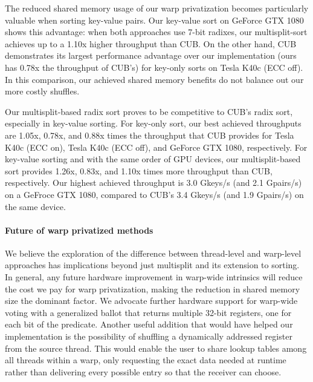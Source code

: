 The reduced shared memory usage of our warp privatization becomes particularly valuable when sorting key-value pairs.
Our key-value sort on GeForce GTX 1080 shows this advantage: when both approaches use 7-bit radixes, our multisplit-sort achieves up to a 1.10x higher throughput than CUB\@.
On the other hand, CUB demonstrates its largest performance advantage over our implementation (ours has 0.78x the throughput of CUB's) for key-only sorts on Tesla K40c (ECC off). In this comparison, our achieved shared memory benefits do not balance out our more costly shuffles.


Our multisplit-based radix sort proves to be competitive to CUB's radix sort, especially in key-value sorting. 
For key-only sort, our best achieved throughputs are 1.05x, 0.78x, and 0.88x times the throughput that CUB provides for Tesla K40c (ECC on), Tesla K40c (ECC off), and GeForce GTX 1080, respectively.
For key-value sorting and with the same order of GPU devices, our multisplit-based sort provides 1.26x, 0.83x, and 1.10x times more throughput than CUB, respectively. 
Our highest achieved throughput is 3.0 Gkeys/s (and 2.1 Gpairs/s) on a GeFroce GTX 1080, compared to CUB's 3.4 Gkeys/s (and 1.9 Gpairs/s) on the same device. 

\paragraph{Future of warp privatized methods}
We believe the exploration of the difference between thread-level and warp-level approaches has implications beyond just multisplit and its extension to sorting.
In general, any future hardware improvement in warp-wide intrinsics will reduce the cost we pay for warp privatization, making the reduction in shared memory size the dominant factor. We advocate further hardware support for warp-wide voting with a generalized ballot that returns multiple 32-bit registers, one for each bit of the predicate.
Another useful addition that would have helped our implementation is the possibility of shuffling a dynamically addressed register from the source thread.
This would enable the user to share lookup tables among all threads within a warp, only requesting the exact data needed at runtime rather than delivering every possible entry so that the receiver can choose.
